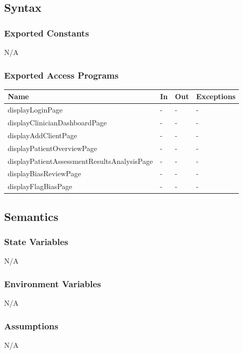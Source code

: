 \documentclass[12pt, titlepage]{article}
\begin{document}
\subsection{Syntax}

\subsubsection{Exported Constants}

N/A

\subsubsection{Exported Access Programs}

\begin{center}
\begin{tabular}{p{8cm} p{2cm} p{2cm} p{2cm}}
\hline
\textbf{Name} & \textbf{In} & \textbf{Out} & \textbf{Exceptions} \\
\hline
displayLoginPage & - & - & - \\
displayClinicianDashboardPage & - & - & - \\
displayAddClientPage & - & - & - \\
displayPatientOverviewPage & - & - & - \\
displayPatientAssessmentResultsAnalysisPage & - & - & - \\
displayBiasReviewPage & - & - & - \\
displayFlagBiasPage & - & - & - \\
\hline
\end{tabular}
\end{center}

\subsection{Semantics}

\subsubsection{State Variables}
N/A

\subsubsection{Environment Variables}
N/A

\subsubsection{Assumptions}
N/A
\end{document}
